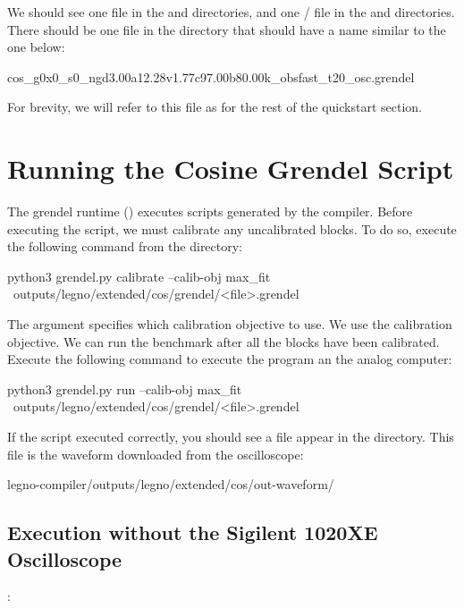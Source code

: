 We should see one  file in the  and 
directories, and one / file in the  and
 directories. There should be one  file in the
 directory that should have a name similar to the one below:

\begin{snippet}
  cos_g0x0_s0_ngd3.00a12.28v1.77c97.00b80.00k_obsfast_t20_osc.grendel
\end{snippet}

For brevity, we will refer to this file as  for the rest of
the quickstart section. 

\section{Running the Cosine Grendel Script}

The grendel runtime () executes  scripts generated
by the \legno compiler. Before executing the script, we must calibrate any
uncalibrated blocks. To do so, execute the following command from the
 directory:


\begin{snippet}
python3 grendel.py calibrate --calib-obj max_fit \
  outputs/legno/extended/cos/grendel/<file>.grendel 
\end{snippet}

The  argument specifies which calibration objective to use.
We use the \tx{max_fit} calibration objective.
We can run the benchmark after all the blocks have been calibrated. Execute the
following command to execute the program an the analog computer:

\begin{snippet}
python3 grendel.py run --calib-obj max_fit \
  outputs/legno/extended/cos/grendel/<file>.grendel 
\end{snippet}

If the script executed correctly, you should see a  file appear in
the  directory. This file is the waveform downloaded from the
oscilloscope:

\begin{snippet}
legno-compiler/outputs/legno/extended/cos/out-waveform/
\end{snippet}

\subsection{Execution without the Sigilent 1020XE Oscilloscope}:

